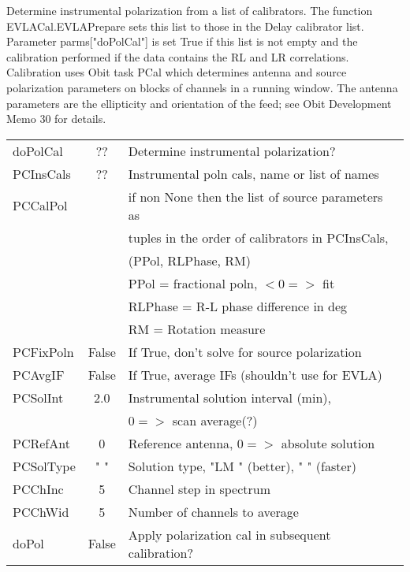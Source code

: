 \documentclass[11pt]{article}
\begin{document}
\begin{enumerate}
Determine instrumental polarization from a list of calibrators.
The function EVLACal.EVLAPrepare sets this list to those in the Delay
calibrator list.
Parameter parms["doPolCal"] is set True if this list is not empty and
the calibration performed if the data contains the RL and LR
correlations. 
Calibration uses Obit task PCal which determines antenna and source
polarization parameters on blocks of channels in a running window.
The antenna parameters are the ellipticity and orientation of the
feed; see Obit Development Memo 30 for details.\\
\begin{center}
\begin{tabular}{|l|c|l|}
\hline
doPolCal  & ??     &  Determine instrumental polarization? \\
PCInsCals & ??     &  Instrumental poln cals, name or list of names\\
PCCalPol  &  &  if non None then the list of source parameters as \\
           & &  tuples in the order of calibrators in PCInsCals,\\
           & &  (PPol, RLPhase, RM)\\
           & &   PPol = fractional poln, $<0 =>$ fit\\
           & &   RLPhase = R-L phase difference in deg\\
           & &   RM      = Rotation measure \\
PCFixPoln & False  &  If True, don't solve for source polarization\\
PCAvgIF   & False  &  If True, average IFs (shouldn't use for EVLA)\\
PCSolInt  & 2.0    &  Instrumental solution interval (min), \\
          &        & $0=>$ scan average(?) \\
PCRefAnt  & 0      &  Reference antenna, $0=>$ absolute solution \\
PCSolType & "    " &  Solution type, "LM  " (better), "    " (faster)\\
PCChInc   & 5      &  Channel step in spectrum \\
PCChWid   & 5      &  Number of channels to average \\
doPol     & False  &  Apply polarization cal in subsequent calibration?\\

\end{tabular}
\end{center}
\end{enumerate}
\end{document}
